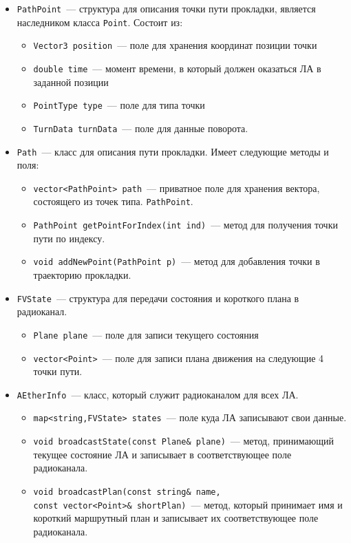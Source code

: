 \documentclass[a4paper,12pt]{article}
\numberwithin{figure}{subsubsection}
\begin{document}
\begin{itemize}
\begin{itemize}
        \end{itemize}
    \item \texttt{PathPoint}~--- структура для описания точки пути прокладки, является наследником класса \texttt{Point}. Состоит из:
    \begin{itemize}
        \item \texttt{Vector3 position}~--- поле для хранения координат позиции точки
        \item \texttt{double time}~--- момент времени, в который должен оказаться ЛА в заданной позиции
        \item \texttt{PointType type}~--- поле для типа точки
        \item  \texttt{TurnData turnData}~--- поле для данные поворота. 
    \end{itemize}
    \item \texttt{Path}~--- класс для описания пути прокладки. Имеет следующие методы и поля:
    \begin{itemize}
        \item \texttt{vector<PathPoint> path}~--- приватное поле для хранения вектора, состоящего из точек типа. \texttt{PathPoint}.
        \item \texttt{PathPoint getPointForIndex(int ind)}~--- метод для получения точки пути по индексу.
        \item \texttt{void addNewPoint(PathPoint p)}~--- метод для добавления точки в траекторию прокладки.
    \end{itemize}
    \item \texttt{FVState}~--- структура для передачи состояния и короткого плана в радиоканал.  
    \begin{itemize}
        \item \texttt{Plane plane}~--- поле для записи текущего состояния
        \item \texttt{vector<Point>}~--- поле для записи плана движения на следующие 4 точки пути.
    \end{itemize}
    \item \texttt{AEtherInfo}~--- класс, который служит радиоканалом для всех ЛА.  
    \begin{itemize}
        \item \texttt{map<string,FVState> states}~---  поле куда ЛА записывают свои данные.
        \item \texttt{void broadcastState(const Plane\& plane)}~--- метод, принимающий текущее состояние ЛА и записывает в соответствующее поле радиоканала.
        \item \texttt{void broadcastPlan(const string\& name,\\ const vector<Point>\& shortPlan)}~--- метод, который принимает имя и короткий маршрутный план и записывает их соответствующее поле радиоканала.

\end{itemize}
\end{itemize}
\end{document}
